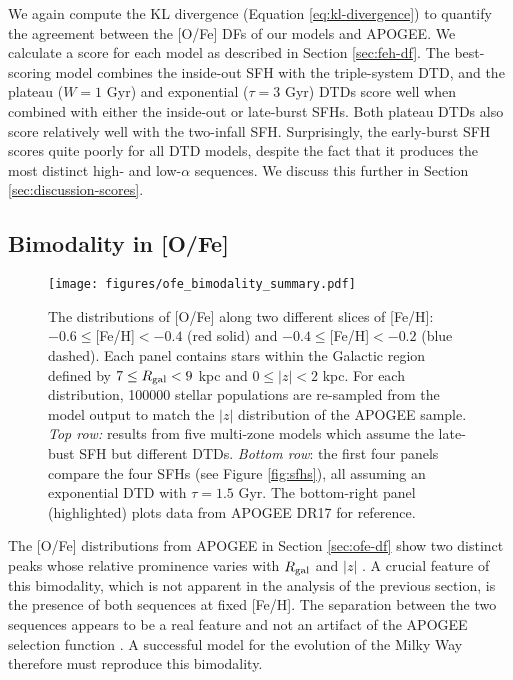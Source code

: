 \documentclass[twocolumn,twocolappendix]{aastex631}
\begin{document}
We again compute the KL divergence (Equation \ref{eq:kl-divergence}) to quantify the agreement between the [O/Fe] DFs of our models and APOGEE. We calculate a score for each model as described in Section \ref{sec:feh-df}. The best-scoring model combines the inside-out SFH with the triple-system DTD, and the plateau ($W=1$ Gyr) and exponential ($\tau=3$ Gyr) DTDs score well when combined with either the inside-out or late-burst SFHs. Both plateau DTDs also score relatively well with the two-infall SFH. Surprisingly, the early-burst SFH scores quite poorly for all DTD models, despite the fact that it produces the most distinct high- and low-$\alpha$ sequences. We discuss this further in Section \ref{sec:discussion-scores}.

\subsection{Bimodality in [O/Fe]}
\label{sec:bimodality}

\begin{figure*}
    \centering
    \texttt{[image: figures/ofe\_bimodality\_summary.pdf]}
    \caption{The distributions of [O/Fe] along two different slices of [Fe/H]: $-0.6\leq$[Fe/H]$<-0.4$ (red solid) and $-0.4\leq$[Fe/H]$<-0.2$ (blue dashed). Each panel contains stars within the Galactic region defined by $7\leq R_{\rm gal}<9$ kpc and $0\leq|z|<2$ kpc. For each distribution, \num{100000} stellar populations are re-sampled from the model output to match the $|z|$ distribution of the APOGEE sample.
    \textit{Top row:} results from five multi-zone models which assume the late-bust SFH but different DTDs. \textit{Bottom row}: the first four panels compare the four SFHs (see Figure \ref{fig:sfhs}), all assuming an exponential DTD with $\tau=1.5$ Gyr. The bottom-right panel (highlighted) plots data from APOGEE DR17 for reference.}
    \label{fig:ofe-bimodality}
\end{figure*}

The [O/Fe] distributions from APOGEE in Section \ref{sec:ofe-df} show two distinct peaks whose relative prominence varies with $R_{\rm gal}$ and $|z|$ \citep[see also Figure 4 of][]{Hayden2015-ChemicalCartography}. A crucial feature of this bimodality, which is not apparent in the analysis of the previous section, is the presence of both sequences at fixed [Fe/H]. The separation between the two sequences appears to be a real feature and not an artifact of the APOGEE selection function \citep{Vincenzo2021-AlphaDistribution}. A successful model for the evolution of the Milky Way therefore must reproduce this bimodality.
\end{document}

